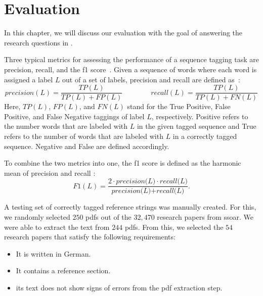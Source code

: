 \chapter{Evaluation}\label{cha:evaluation}

In this chapter, we will discuss our evaluation with the goal of answering the research questions in .

Three typical metrics for assessing the performance of a sequence tagging task are \gls{precision}, \gls{recall}, and the \gls{f1 score}~\citep{councill2008parscit}.
Given a sequence of words where each word is assigned a label $L$ out of a set of labels, \gls{precision} and \gls{recall} are defined as~\citep{goutte2005probabilistic}:
\begin{equation*}
  \textit{precision}(L)=\frac{TP(L)}{TP(L)+FP(L)}\hspace{4em}\textit{recall}(L)=\frac{TP(L)}{TP(L)+FN(L)}
\end{equation*}
Here, $TP(L)$, $FP(L)$, and $FN(L)$ stand for the True Positive, False Positive, and False Negative taggings of label $L$, respectively.
Positive refers to the number words that are labeled with $L$ in the given tagged sequence and True refers to the number of words that are labeled with $L$ in a correctly tagged sequence.
Negative and False are defined accordingly.

To combine the two metrics into one, the \gls{f1 score} is defined as the harmonic mean of \gls{precision} and \gls{recall} \citep{bilenko2003adaptive}:
\begin{equation*}
  \textit{F1}(L)=\frac{2\cdot\textit{precision(L)}\cdot\textit{recall(L)}}{\textit{precision(L)}+\textit{recall(L)}}.
\end{equation*}

A testing set of correctly tagged reference strings was manually created.
For this, we randomly selected $250$ \glspl{pdf} out of the $32,470$ research papers from \gls{ssoar}.
We were able to extract the text from $244$ \glspl{pdf}.
From this, we selected the $54$ research papers that satisfy the following requirements:
\begin{itemize}
  \item It is written in German.
  \item It contains a reference section.
  \item its text does not show signs of errors from the \gls{pdf} extraction step.
\end{itemize}

